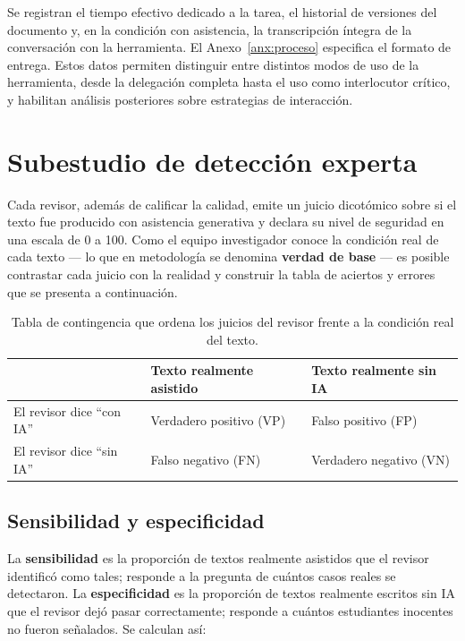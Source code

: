 \documentclass[12pt,a4paper,openany]{report}
\begin{document}
    Se registran el tiempo efectivo dedicado a la tarea, el historial de versiones del documento y, en la condici\'on con asistencia, la transcripci\'on \'integra de la conversaci\'on con la herramienta. El Anexo~\ref{anx:proceso} especifica el formato de entrega. Estos datos permiten distinguir entre distintos modos de uso de la herramienta, desde la delegaci\'on completa hasta el uso como interlocutor cr\'itico, y habilitan an\'alisis posteriores sobre estrategias de interacci\'on.
    
    \section{Subestudio de detecci\'on experta}
    
    Cada revisor, adem\'as de calificar la calidad, emite un juicio dicot\'omico sobre si el texto fue producido con asistencia generativa y declara su nivel de seguridad en una escala de 0 a 100. Como el equipo investigador conoce la condici\'on real de cada texto --- lo que en metodolog\'ia se denomina \textbf{verdad de base} --- es posible contrastar cada juicio con la realidad y construir la tabla de aciertos y errores que se presenta a continuaci\'on.
    
    \begin{table}[htbp]
        \centering
        \caption{Tabla de contingencia que ordena los juicios del revisor frente a la condici\'on real del texto.}
        \label{tab:contingencia}
        \small
        \begin{tabular}{L{4.2cm} C{4.4cm} C{4.4cm}}
            \toprule
            & \textbf{Texto realmente asistido} & \textbf{Texto realmente sin IA} \\
            \midrule
            El revisor dice ``con IA''  & Verdadero positivo (VP) & Falso positivo (FP) \\
            El revisor dice ``sin IA''  & Falso negativo (FN)     & Verdadero negativo (VN) \\
            \bottomrule
        \end{tabular}
    \end{table}
    
    \subsection{Sensibilidad y especificidad}
    
    La \textbf{sensibilidad} es la proporci\'on de textos realmente asistidos que el revisor identific\'o como tales; responde a la pregunta de cu\'antos casos reales se detectaron. La \textbf{especificidad} es la proporci\'on de textos realmente escritos sin IA que el revisor dej\'o pasar correctamente; responde a cu\'antos estudiantes inocentes no fueron se\~nalados. Se calculan as\'i:
    
\end{document}
